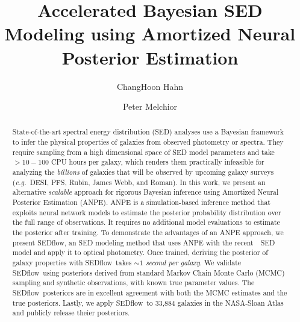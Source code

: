 \documentclass[12pt, letterpaper, preprint, comicneue]{aastex63}
\newcommand{\eg}{\emph{e.g.}}
\newcommand{\sedflow}{{\sc SEDflow}}
\begin{document}
 \sloppy\sloppypar\frenchspacing 

\title{Accelerated Bayesian SED Modeling using Amortized Neural Posterior Estimation}

\author[0000-0003-1197-0902]{ChangHoon Hahn}

\author[0000-0002-8873-5065]{Peter Melchior}

\begin{abstract}
    State-of-the-art spectral energy distribution (SED) analyses use a
    Bayesian framework to infer the physical properties of galaxies from
    observed photometry or spectra.
    They require sampling from a high dimensional space of SED model parameters
    and take $>10-100$ CPU hours per galaxy, which renders them practically
    infeasible for analyzing the {\em billions} of galaxies that will be
    observed by upcoming galaxy surveys
    (\eg~DESI, PFS, Rubin, James Webb, and Roman). 
    In this work, we present an alternative \emph{scalable} approach for
    rigorous Bayesian inference using Amortized Neural Posterior
    Estimation (ANPE). 
    ANPE is a simulation-based inference method that exploits neural network
    models to estimate the posterior probability distribution over the full
    range of observations.
    It requires no additional model evaluations to estimate the posterior after
    training. 
    To demonstrate the advantages of an ANPE approach, we present \sedflow, an
    SED modeling method that uses ANPE with the recent~\cite{hahn2022}~SED model 
    and apply it to optical photometry. 
    Once trained, deriving the posterior of galaxy properties with 
    \sedflow~takes \emph{${\sim}1$ second per galaxy}. 
    We validate \sedflow~using posteriors derived from standard
    Markov Chain Monte Carlo (MCMC) sampling and synthetic observations, with
    known true parameter values.  
    The \sedflow~posteriors are in excellent agreement with both the MCMC
    estimates and the true posteriors. 
    Lastly, we apply \sedflow~to 33,884 galaxies in the NASA-Sloan Atlas and
    publicly release theier posteriors.
\end{abstract}
\end{document}
